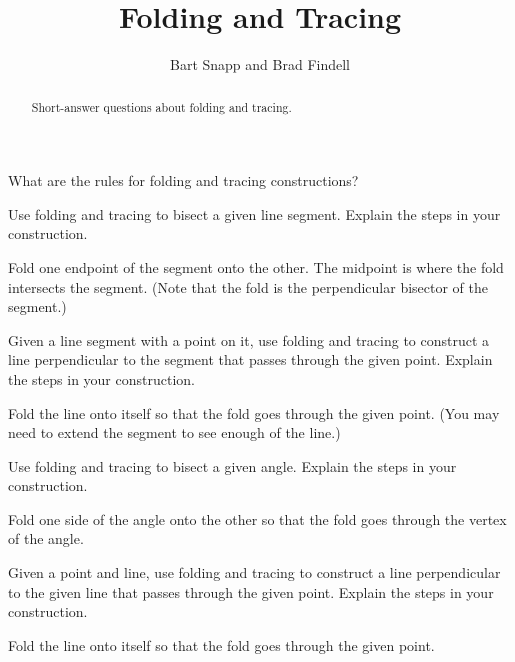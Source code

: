 \documentclass[nooutcomes]{ximera}
\title{Folding and Tracing}
\author{Bart Snapp and Brad Findell}
\begin{document}
\begin{abstract}
Short-answer questions about folding and tracing. 
\end{abstract}
\maketitle


\begin{problem}
What are the rules for folding and tracing constructions?
\end{problem}

\begin{problem}
Use folding and tracing to bisect a given line segment. Explain the steps in
  your construction.
\begin{hint}
Fold one endpoint of the segment onto the other.  The midpoint is where the fold intersects the segment.  (Note that the fold is the perpendicular bisector of the segment.)
\end{hint}
\end{problem}

\begin{problem}
Given a line segment with a point on it, use folding and tracing to
  construct a line perpendicular to the segment that passes through
  the given point. Explain the steps in your construction.
\begin{hint}
Fold the line onto itself so that the fold goes through the given point.  (You may need to extend the segment to see enough of the line.)
\end{hint}
\end{problem}

\begin{problem}
Use folding and tracing to bisect a given angle. Explain the steps in your
  construction.
\begin{hint}
Fold one side of the angle onto the other so that the fold goes through the vertex of the angle. 
\end{hint}
\end{problem}

\begin{problem}
Given a point and line, use folding and tracing to construct a line
  perpendicular to the given line that passes through the given
  point. Explain the steps in your construction.
\begin{hint}
Fold the line onto itself so that the fold goes through the given point. 
\end{hint}
\end{problem}
\end{document}
